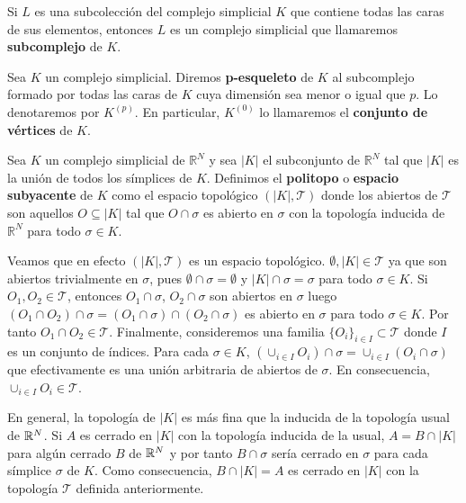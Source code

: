 \begin{definicion}
	Si \(L\) es una subcolección del complejo simplicial \(K\) que contiene todas las caras
	de sus elementos, entonces \(L\) es un complejo simplicial que llamaremos
	\textbf{subcomplejo} de \(K\).
\end{definicion}
\begin{definicion}
	Sea \(K\) un complejo simplicial. Diremos \textbf{p-esqueleto} de \(K\) al subcomplejo
	formado por todas las caras de \(K\) cuya dimensión sea menor o igual que \(p\).
	Lo denotaremos por \(K^{(p)}\). En particular, \(K^{(0)}\) lo llamaremos el
	\textbf{conjunto de vértices} de \(K\).
\end{definicion}
\begin{definicion}
	Sea \(K\) un complejo simplicial de \(\mathbb{R}^{N}\) y sea \(|K|\) el subconjunto de
	\(\mathbb{R}^{N}\) tal que \(|K|\) es la unión de todos los símplices de \(K\).
	Definimos el \textbf{politopo} o \textbf{espacio subyacente} de \(K\) como el
	espacio topológico \((|K|, \mathcal{T})\) donde los abiertos de \(\mathcal{T}\)
	son aquellos \(O \subseteq |K|\) tal que \(O \cap \sigma\) es abierto en \(\sigma\)
	con la topología inducida de \(\mathbb{R}^{N}\) para todo \(\sigma \in K\).
\end{definicion}

Veamos que en efecto \((|K|, \mathcal{T})\) es un espacio topológico.
\(\emptyset, |K| \in \mathcal{T}\) ya que son abiertos trivialmente en \(\sigma\), pues
\(\emptyset \cap \sigma = \emptyset\) y \(|K| \cap \sigma = \sigma\) para todo \(\sigma
\in K\). Si \(O_{1}, O_{2}\in \mathcal{T}\), entonces \(O_{1}\cap \sigma\),
\(O_{2}\cap \sigma\) son abiertos en \(\sigma\) luego
\((O_{1}\cap O_{2}) \cap \sigma = (O_{1}\cap \sigma) \cap (O_{2}\cap \sigma)\) es
abierto en \(\sigma\) para todo \(\sigma \in K\). Por tanto \(O_{1}\cap O_{2}\in \mathcal{T}\).
Finalmente, consideremos una familia \(\{O_{i}\}_{i \in I}\subset \mathcal{T}\) donde
\(I\) es un conjunto de índices. Para cada \(\sigma \in K\), \((\cup_{i \in I}O_{i}) \cap
\sigma = \cup_{i \in I}(O_{i}\cap \sigma)\) que efectivamente es una unión arbitraria
de abiertos de \(\sigma\). En consecuencia, \(\cup_{i \in I}O_{i}\in \mathcal{T}\).

En general, la topología de \(|K|\) es más fina que la inducida de la topología
usual de \(\mathbb{R}^{N}\). Si \(A\) es cerrado en \(|K|\) con la topología inducida de la usual,
\(A=B \cap |K|\) para algún cerrado \(B\) de \(\mathbb{R}^{N}\) y por tanto \(B \cap \sigma\)
sería cerrado en \(\sigma\) para cada símplice \(\sigma\) de \(K\). Como consecuencia,
\(B \cap |K|=A\) es cerrado en \(|K|\) con la topología \(\mathcal{T}\) definida
anteriormente.

